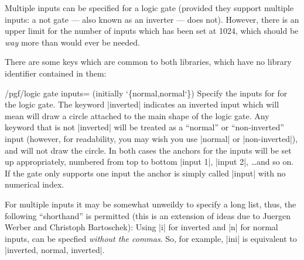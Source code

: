 	Multiple inputs can be specified for a logic gate (provided they
  support multiple inputs: a not gate --- also known as an inverter ---
  does not). However, there is an upper limit for the number of inputs 
  which has been set at 1024, which should be \emph{way} 
  more than would ever be needed.
    
  There are some \pgfname{} keys which are common to both 
  libraries, which have no library identifier contained in them:
  
  
  \begin{key}{/pgf/logic gate inputs= (initially \char`\{normal,normal\char`\})}
  Specify the inputs for for the logic gate. The keyword |inverted|
  indicates an inverted input which will mean \pgfname{} will draw a
  circle attached to the main shape of the logic gate. Any keyword
  that is not |inverted| will be treated as a ``normal'' or 
  ``non-inverted'' input (however, for readability, you may wish you 
  use |normal| or |non-inverted|), and \pgfname{} will not draw the 
  circle.  
  In both cases the anchors for the inputs will be set 
  up appropriately, numbered from top to bottom |input 1|, |input 2|,
  \ldots and so on. If the gate only supports one input the anchor
  is simply called |input| with no numerical index.
  
\begin{codeexample}[]
\end{codeexample} 
  
  For multiple inputs it may be somewhat unweildy to specify a long
  list, thus, the following ``shorthand'' is permitted (this is an  
  extension of ideas due to Juergen Werber and Christoph Bartoschek):
  Using |i| for inverted and |n| for normal inputs, 
  can be specfied \emph{without the commas}. So, for example,
  |ini| is equivalent to |inverted, normal, inverted|.
  
\begin{codeexample}[]
\end{codeexample} 
 
\end{key}


